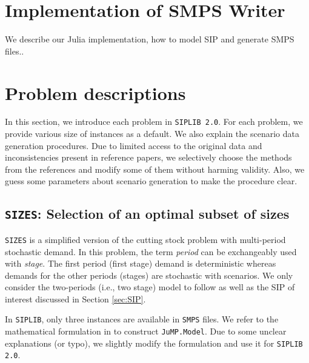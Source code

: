 \section{Implementation of SMPS Writer}

We describe our Julia implementation, how to model SIP and generate SMPS files..

\section{Problem descriptions} \label{sec:prob_desc}

In this section, we introduce each problem in \texttt{SIPLIB 2.0}.  For each problem, we provide various size of instances as a default. We also explain the scenario data generation procedures. Due to limited access to the original data and inconsistencies present in reference papers, we selectively choose the methods from the references and modify some of them without harming validity. Also, we guess some parameters about scenario generation to make the procedure clear.  %

\subsection{\texttt{SIZES}: Selection of an optimal subset of sizes}
\texttt{SIZES} is a simplified version of the cutting stock problem with multi-period stochastic demand. In this problem, the term \textit{period} can be exchangeably used with \textit{stage}. The first period (first stage) demand is deterministic whereas demands for the other periods (stages) are stochastic with scenarios. We only consider the two-periods (i.e., two stage) model to follow \cite{journal:JSW1999} as well as the SIP of interest discussed in Section \ref{sec:SIP}. 

In \texttt{SIPLIB}, only three instances are available in \texttt{SMPS} files. We refer to the mathematical formulation in \cite{journal:JSW1999} to construct \texttt{JuMP.Model}. Due to some unclear explanations (or typo), we slightly modify the formulation and use it for \texttt{SIPLIB 2.0}.

